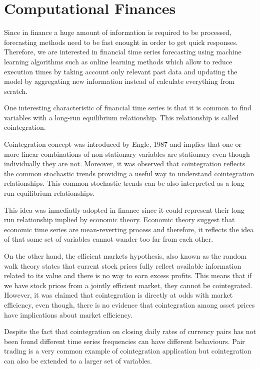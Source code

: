 \section{Computational Finances}

Since in finance a huge amount of information is required to be processed,
forecasting methods need to be fast enought in order to get quick responses.
Therefore, we are interested in financial time series forecasting using machine
learning algorithms such as online learning methods which allow to reduce
execution times by taking account only relevant past data and updating the model
by aggregating new information instead of calculate everything from scratch. 

One interesting characteristic of financial time series is that it is common to
find variables with a long-run equilibrium relationship. This relationship is
called cointegration. 

Cointegration concept was introduced by Engle, 1987 and implies that one or more
linear combinations of non-stationary variables are stationary even though
individually they are not.  Moreover, it was observed that cointegration
reflects the common stochastic trends providing a useful way to understand
cointegration relationships. This common stochastic trends can be also
interpreted as a long-run equilibrium relationships.

This idea was inmediatly adopted in finance since it could represent their
long-run relationship implied by economic theory.  Economic theory suggest that
economic time series are mean-reverting process and therefore, it reflects the
idea of that some set of variables cannot wander too far from each other. 

On the other hand, the efficient markets hypothesis, also known as the random
walk theory states that current stock prices fully reflect available information
related to its value and there is no way to earn excess profits.  This means
that if we have stock prices from a jointly efficient market, they cannot be
cointegrated. However, it was claimed that cointegration is directly at odds
with market efficiency, even though, there is no evidence that cointegration
among asset prices have implications about market efficiency.

Despite the fact that cointegration on closing daily rates of currency pairs has
not been found different time series frequencies can have different behaviours.
Pair trading is a very common example of cointegration application but
cointegration can also be extended to a larger set of variables.

